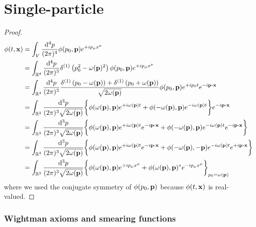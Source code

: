 \section{Single-particle}

\begin{proof}
\begin{equation*}
	\begin{split}
		\phi(t,\vb{x})
		&=
		\int_V\frac{\dd[4]{p}}{(2\pi)^4}
		\phi(p_0,\vb{p})
		e^{+ip_\mu x^\mu}
		\\
		&=
		\int_{\mathbb{R}^4}\frac{\dd[4]{p}}{(2\pi)^3}
		\delta^{(1)}\left(p_0^2-\omega(\vb{p})^2\right)
		\phi(p_0,\vb{p})
		e^{+ip_\mu x^\mu}
		\\
		&=
		\int_{\mathbb{R}^4}\frac{\dd[4]{p}}{(2\pi)^3}
		\frac{
			\delta^{(1)}\left(p_0-\omega(\vb{p})\right)
			+
			\delta^{(1)}\left(p_0+\omega(\vb{p})\right)
		}{\sqrt{2\omega(\vb{p})}}
		\phi(p_0,\vb{p})
		e^{+ip_0t}
		e^{-i\vb{p}\vdot\vb{x}}
		\\
		&=
		\int_{\mathbb{R}^3}\frac{\dd[3]{p}}{(2\pi)^3\sqrt{2\omega(\vb{p})}}
		\biggl\{
			\phi(\omega(\vb{p}),\vb{p})
			e^{+i\omega(\vb{p})t}
			+
			\phi(-\omega(\vb{p}),\vb{p})
			e^{-i\omega(\vb{p})t}
		\biggr\}
		e^{-i\vb{p}\vdot\vb{x}}
		\\
		&=
		\int_{\mathbb{R}^3}\frac{\dd[3]{p}}{(2\pi)^3\sqrt{2\omega(\vb{p})}}
		\biggl\{
			\phi(\omega(\vb{p}),\vb{p})
			e^{+i\omega(\vb{p})t}
			e^{-i\vb{p}\vdot\vb{x}}
			+
			\phi(-\omega(\vb{p}),\vb{p})
			e^{-i\omega(\vb{p})t}
			e^{-i\vb{p}\vdot\vb{x}}
		\biggr\}
		\\
		&=
		\int_{\mathbb{R}^3}\frac{\dd[3]{p}}{(2\pi)^3\sqrt{2\omega(\vb{p})}}
		\biggl\{
			\phi(\omega(\vb{p}),\vb{p})
			e^{+i\omega(\vb{p})t}
			e^{-i\vb{p}\vdot\vb{x}}
			+
			\phi(-\omega(\vb{p}),-\vb{p})
			e^{-i\omega(\vb{p})t}
			e^{+i\vb{p}\vdot\vb{x}}
		\biggr\}
		\\
		&=
		\int_{\mathbb{R}^3}\frac{\dd[3]{p}}{(2\pi)^3\sqrt{2\omega(\vb{p})}}
		\biggl\{
			\phi(\omega(\vb{p}),\vb{p})
			e^{+ip_\mu x^\mu}
			+
			\phi(\omega(\vb{p}),\vb{p})^*
			e^{-ip_\mu x^\mu}
		\biggr\}_{p_0=\omega(\vb{p})}
	\end{split}
\end{equation*}
where we used the conjugate symmetry of $\phi(p_0,\vb{p})$ because $\phi(t,\vb{x})$ is real-valued.
\end{proof}

\subsubsection{Wightman axioms and smearing functions}

